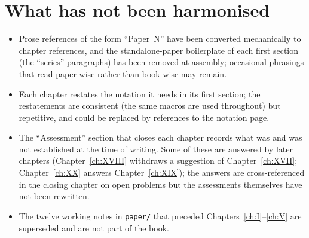 \section*{What has not been harmonised}
\begin{itemize}
\item Prose references of the form ``Paper~N'' have been converted mechanically to
      chapter references, and the standalone-paper boilerplate of each first section
      (the ``series'' paragraphs) has been removed at assembly; occasional phrasings that
      read paper-wise rather than book-wise may remain.
\item Each chapter restates the notation it needs in its first section; the
      restatements are consistent (the same macros are used throughout) but repetitive,
      and could be replaced by references to the notation page.
\item The ``Assessment'' section that closes each chapter records what was and was not
      established at the time of writing. Some of these are answered by later chapters
      (Chapter~\ref{ch:XVIII} withdraws a suggestion of Chapter~\ref{ch:XVII};
      Chapter~\ref{ch:XX} answers Chapter~\ref{ch:XIX}); the answers are cross-referenced
      in the closing chapter on open problems but the assessments themselves have not
      been rewritten.
\item The twelve working notes in \texttt{paper/} that preceded Chapters~\ref{ch:I}--\ref{ch:V}
      are superseded and are not part of the book.
\end{itemize}
